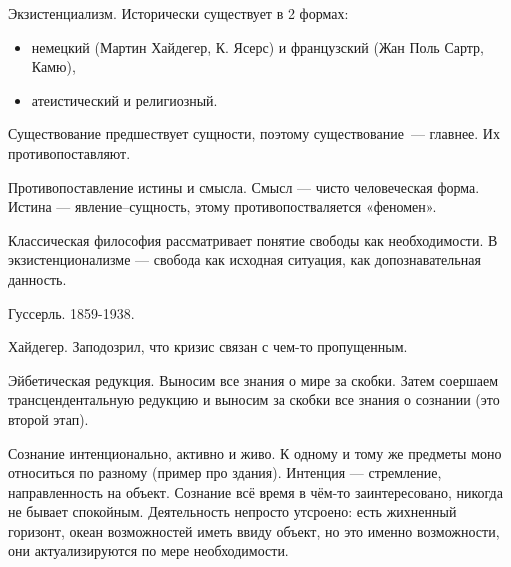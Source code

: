 Экзистенциализм.
Исторически существует в 2 формах:
\begin{itemize}
	\item немецкий (Мартин Хайдегер, К. Ясерс) и французский (Жан Поль Сартр, Камю),
	\item атеистический и религиозный.
\end{itemize}

Существование предшествует сущности, поэтому существование~--- главнее. Их противопоставляют.

Противопоставление истины и смысла. Смысл --- чисто человеческая форма. Истина --- явление--сущность, этому противопостваляется «феномен».

Классическая философия рассматривает понятие свободы как необходимости. В экзистенционализме --- свобода как исходная ситуация, как допознавательная данность.

Гуссерль. 1859-1938.

Хайдегер. Заподозрил, что кризис связан с чем-то пропущенным.

Эйбетическая редукция. Выносим все знания о мире за скобки. Затем соершаем трансцендентальную редукцию и выносим за скобки все знания о сознании (это второй этап).

Сознание интенционально, активно и живо. К одному и тому же предметы моно относиться по разному (пример про здания).
Интенция --- стремление, направленность на объект. Сознание всё время в чём-то заинтересовано, никогда не бывает спокойным. Деятельность непросто утсроено: есть жихненный горизонт, океан возможностей иметь ввиду объект, но это именно возможности, они актуализируются по мере необходимости.

